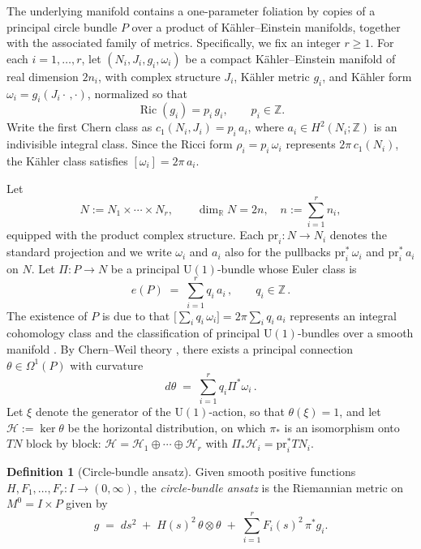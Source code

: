 \documentclass[11pt]{amsart}
\theoremstyle{plain}
\numberwithin{equation}{section}
\theoremstyle{definition}
\newtheorem{definition}[theorem]{Definition}
\theoremstyle{remark}
\begin{document}
The underlying manifold contains a one-parameter foliation by copies of a principal circle bundle $P$ over a product of Kähler--Einstein manifolds, together with the associated family of metrics. Specifically, we fix an integer $r \geq 1$. For each $i = 1, \dots, r$, let $(N_i, J_i, g_i, \omega_i)$ be a compact K\"{a}hler--Einstein manifold of real dimension $2n_i$, with complex structure $J_i$, Kähler metric $g_i$, and Kähler form $\omega_i = g_i(J_i \cdot\,, \cdot)$, normalized so that
\[
\operatorname{Ric}(g_i) = p_i\, g_i, \qquad p_i \in \mathbb{Z}.
\]
Write the first Chern class as $c_1(N_i, J_i) = p_i\, a_i$, where $a_i \in H^2(N_i; \mathbb{Z})$ is an {indivisible} integral class. Since the Ricci form $\rho_i = p_i\, \omega_i$ represents $2\pi\, c_1(N_i)$, the Kähler class satisfies $[\omega_i] = 2\pi\, a_i$.

Let
\[
N := N_1 \times \cdots \times N_r, \qquad \dim_{\mathbb{R}} N = 2n, \quad n := \sum_{i=1}^r n_i,
\]
equipped with the product complex structure. Each $\mathrm{pr}_i : N \to N_i$ denotes the standard projection and we write $\omega_i$ and $a_i$ also for the pullbacks $\mathrm{pr}_i^*\, \omega_i$ and $\mathrm{pr}_i^*\, a_i$ on $N$. Let $\Pi : P \to N$ be a principal $\mathrm{U}(1)$-bundle whose Euler class is
\[
e ( P ) \;=\; \sum_{i=1}^r q_i\, a_i \,, \qquad q_i \in \mathbb{Z} \,.
\]
The existence of $P$ is due to that $\big[ \sum_i q_i\, \omega_i \big] = 2 \pi \sum_i q_i\, a_i$ represents an integral cohomology class and the classification of principal $\mathrm{U}(1)$-bundles over a smooth manifold \cite{Hatcher2002}. By Chern–Weil theory \cite[Chapter~XII]{KobayashiNomizu1969}, there exists a principal connection $\theta \in \Omega^1 ( P )$ with curvature
\[
d \theta \;=\; \sum_{i=1}^r q_i \Pi^* \omega_i \,.
\]
Let $\xi$ denote the generator of the $\mathrm{U}(1)$-action, so that $\theta ( \xi ) = 1$, and let $\mathcal{H} := \ker \theta$ be the horizontal distribution, on which $\pi_*$ is an isomorphism onto $TN$ block by block: $\mathcal{H} = \mathcal{H}_1 \oplus \cdots \oplus \mathcal{H}_r$ with $\Pi_* \mathcal{H}_i = \mathrm{pr}_i^* T N_i$.

\begin{definition}[Circle-bundle ansatz]\label{def:ansatz}
	Given smooth positive functions $H, F_1, \dots, F_r : I \to (0, \infty)$, the \emph{circle-bundle ansatz} is the Riemannian metric on $M^0 = I \times P$ given by
	\begin{equation}\label{eq:ansatz-metric}
		g \;=\; ds^2 \;+\; H(s)^2\, \theta \otimes \theta \;+\; \sum_{i=1}^r F_i(s)^2\, \pi^* g_i .
	\end{equation}
\end{definition}
\end{document}
